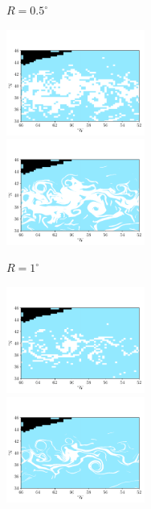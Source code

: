 \begin{figure}
\begin{subfigure}{\textwidth}
		\caption{\(R = 0.5^\circ\)}
	\end{subfigure}
	\begin{subfigure}{\textwidth}
		\includegraphics[width=0.5\textwidth]{chp06_applications/figures/gulf_stream/S2_robust_grid_1.0}
		\includegraphics[width=0.5\textwidth]{chp06_applications/figures/gulf_stream/S2_robust_high_1.0}
		\caption{\(R = 1^\circ\)}
	\end{subfigure}
	\begin{subfigure}{\textwidth}
		\includegraphics[width=0.5\textwidth]{chp06_applications/figures/gulf_stream/S2_robust_grid_4.0}
		\includegraphics[width=0.5\textwidth]{chp06_applications/figures/gulf_stream/S2_robust_high_4.0}

\end{subfigure}
\end{figure}
